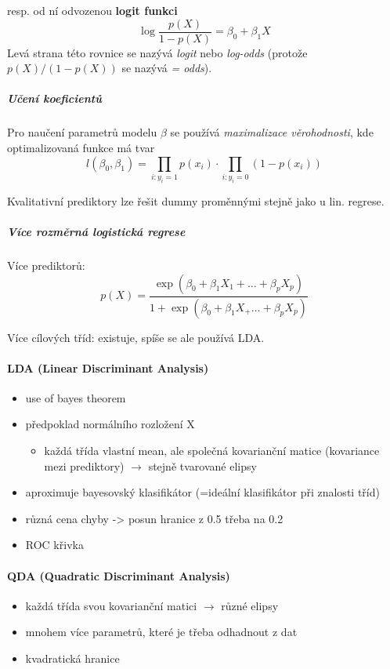 \documentclass[11pt]{report} %
\numberwithin{equation}{section}
\begin{document}
	resp. od ní odvozenou \textbf{logit funkci}
	$$\log\frac{p(X)}{1 - p(X)} = \beta_0 + \beta_1 X$$
	Levá strana této rovnice se nazývá \textit{logit} nebo \textit{log-odds} (protože $p(X)/(1-p(X))$ se nazývá \textit{ = odds}). 
	
	\subparagraph{Učení koeficientů}
	Pro naučení parametrů modelu $\beta$ se používá \textit{maximalizace věrohodnosti}, kde optimalizovaná funkce má tvar $$l(\beta_0,\beta_1) = \prod_{i : y_i = 1} p(x_i) \cdot \prod_{i : y_i = 0} (1-p(x_i))$$
	
	Kvalitativní prediktory lze řešit dummy proměnnými stejně jako u lin. regrese.

	\subparagraph{Více rozměrná logistická regrese}
	Více prediktorů:
	$$p(X) = \frac{\exp(\beta_0 + \beta_1X_1 + \dots + \beta_pX_p)}{1 + \exp(\beta_0 + \beta_1 X_ + \dots + \beta_pX_p)}$$
	
	Více cílových tříd: existuje, spíše se ale používá LDA.

	\paragraph{LDA (Linear Discriminant Analysis)}
	\begin{itemize}
		\item use of bayes theorem
		\item předpoklad normálního rozložení X
		\begin{itemize} 
			\item každá třída vlastní mean, ale společná kovarianční matice (kovariance mezi prediktory) $\to$ stejně tvarované elipsy
		\end{itemize}
		\item aproximuje bayesovský klasifikátor (=ideální klasifikátor při znalosti tříd)
		\item různá cena chyby -\textgreater{} posun hranice z 0.5 třeba na 0.2
		\item ROC křivka
	\end{itemize}
	\paragraph{QDA (Quadratic Discriminant Analysis)}
	\begin{itemize}
		\item každá třída svou kovarianční matici $\to$ různé elipsy
		\item mnohem více parametrů, které je třeba odhadnout z dat 
		\item kvadratická hranice
	\end{itemize}
	
\end{document}
